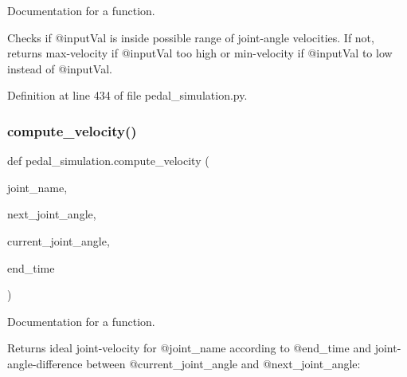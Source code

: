 Documentation for a function. 

Checks if @input\+Val is inside possible range of joint-\/angle velocities. If not, returns max-\/velocity if @input\+Val too high or min-\/velocity if @input\+Val to low instead of @input\+Val. 

Definition at line 434 of file pedal\+\_\+simulation.\+py.


\begin{DoxyCode}{0}

\end{DoxyCode}
\mbox{\label{namespacepedal__simulation_addcf80200775d7c345ec27ef9995c838}} 
\subsubsection{\texorpdfstring{compute\_velocity()}{compute\_velocity()}}
{\footnotesize\ttfamily def pedal\+\_\+simulation.\+compute\+\_\+velocity (\begin{DoxyParamCaption}\item[{}]{joint\+\_\+name,  }\item[{}]{next\+\_\+joint\+\_\+angle,  }\item[{}]{current\+\_\+joint\+\_\+angle,  }\item[{}]{end\+\_\+time }\end{DoxyParamCaption})}



Documentation for a function. 

Returns ideal joint-\/velocity for @joint\+\_\+name according to @end\+\_\+time and joint-\/angle-\/difference between @current\+\_\+joint\+\_\+angle and @next\+\_\+joint\+\_\+angle\+:

